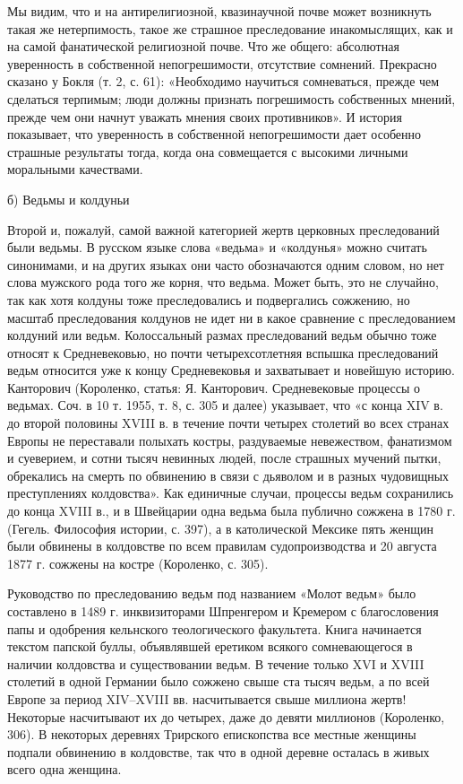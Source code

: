 Мы видим, что и на антирелигиозной, квазинаучной почве может возникнуть такая
же нетерпимость, такое же страшное преследование инакомыслящих, как и на самой
фанатической религиозной почве. Что же общего: абсолютная уверенность в
собственной непогрешимости, отсутствие сомнений. Прекрасно сказано у Бокля (т.
2, с. 61): «Необходимо научиться сомневаться, прежде чем сделаться терпимым;
люди должны признать погрешимость собственных мнений, прежде чем они начнут
уважать мнения своих противников». И история показывает, что уверенность в
собственной непогрешимости дает особенно страшные результаты тогда, когда она
совмещается с высокими личными моральными качествами.

б) Ведьмы и колдуньи

Второй и, пожалуй, самой важной категорией жертв церковных преследований были
ведьмы. В русском языке слова «ведьма» и «колдунья» можно считать синонимами, и
на других языках они часто обозначаются одним словом, но нет слова мужского
рода того же корня, что ведьма. Может быть, это не случайно, так как хотя
колдуны тоже преследовались и подвергались сожжению, но масштаб преследования
колдунов не идет ни в какое сравнение с преследованием колдуний или ведьм.
Колоссальный размах преследований ведьм обычно тоже относят к Средневековью, но
почти четырехсотлетняя вспышка преследований ведьм относится уже к концу
Средневековья и захватывает и новейшую историю. Канторович (Короленко, статья:
Я. Канторович. Средневековые процессы о ведьмах. Соч. в 10 т. 1955, т. 8, с.
305 и далее) указывает, что «с конца XIV в. до второй половины XVIII в. в
течение почти четырех столетий во всех странах Европы не переставали полыхать
костры, раздуваемые невежеством, фанатизмом и суеверием, и сотни тысяч невинных
людей, после страшных мучений пытки, обрекались на смерть по обвинению в связи
с дьяволом и в разных чудовищных преступлениях колдовства». Как единичные
случаи, процессы ведьм сохранились до конца XVIII в., и в Швейцарии одна ведьма
была публично сожжена в 1780 г. (Гегель. Философия истории, с. 397), а в
католической Мексике пять женщин были обвинены в колдовстве по всем правилам
судопроизводства и 20 августа 1877 г. сожжены на костре (Короленко, с. 305).

Руководство по преследованию ведьм под названием «Молот ведьм» было составлено
в 1489 г. инквизиторами Шпренгером и Кремером с благословения папы и одобрения
кельнского теологического факультета. Книга начинается текстом папской буллы,
объявлявшей еретиком
всякого сомневающегося в наличии колдовства и существовании ведьм. В течение
только XVI и XVIII столетий в одной Германии было сожжено свыше ста тысяч
ведьм, а по всей Европе за период XIV--XVIII вв. насчитывается свыше миллиона
жертв! Некоторые насчитывают их до четырех, даже до девяти миллионов
(Короленко, 306). В некоторых деревнях Трирского епископства все местные
женщины подпали обвинению в колдовстве, так что в одной деревне осталась в
живых всего одна женщина.


